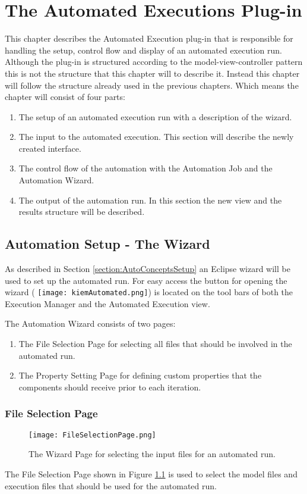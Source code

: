 \chapter{The Automated Executions Plug-in}
This chapter describes the Automated Execution plug-in that is responsible for handling
the setup, control flow and display of an automated execution run.
Although the plug-in is structured according to the model-view-controller pattern this
is not the structure that this chapter will to describe it. Instead this chapter will
follow the structure already used in the previous chapters. Which means the chapter will
consist of four parts:
\begin{enumerate}
 \item The setup of an automated execution run with a description of the wizard.
 \item The input to the automated execution. This section will describe the newly created interface.
 \item The control flow of the automation with the Automation Job and the Automation Wizard.
 \item The output of the automation run. In this section the new view and the results structure will
be described.
\end{enumerate}


\section{Automation Setup - The Wizard}
\label{section:AutoWizard}
As described in Section \ref{section:AutoConceptsSetup} an Eclipse wizard will be used to set up the 
automated run. For easy access the button for opening the wizard (
\texttt{[image: kiemAutomated.png]})
is located on the tool bars of both the Execution Manager and the Automated Execution view.

The Automation Wizard consists of two pages:
\begin{enumerate}
 \item The File Selection Page for selecting all files that should be involved in the automated run.
 \item The Property Setting Page for defining custom properties that the components should receive prior to
each iteration.
\end{enumerate}


\subsection{File Selection Page}
\label{section:FileSelectionPage}
\begin{figure}[File Selection Page]
  \centering
  \texttt{[image: FileSelectionPage.png]}
  \caption[The Wizard Page for selecting the input files for an automated run.]%
  {The Wizard Page for selecting the input files for an automated run.\protect}
  \label{fig:FileSelectionPage}
\end{figure}
The File Selection Page shown in Figure \ref{fig:FileSelectionPage} is used to select the model 
files and execution files that should be used for the automated run.

